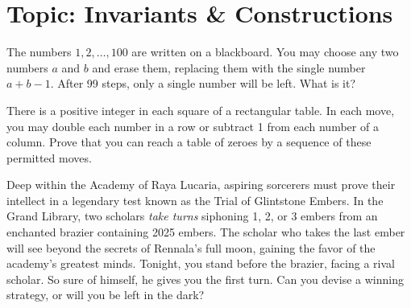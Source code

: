 

\DeclareRobustCommand{\stirling}{\genfrac\{\}{0pt}{}}
\setcounter{secnumdepth}{0} 

\newcommand{\weekNum}{8} %
\newcommand{\meetingDate}{Mar 12, 2025} 


\pagestyle{empty}
\sloppy
\maketitle

\section{Topic: Invariants \& Constructions}

\begin{problem}
    The numbers $1, 2, \ldots , 100$ are written on a blackboard. You may choose any two numbers $a$ and $b$ and erase them, replacing them with the single number $a + b - 1$. After 99 steps, only a single number will be left. What is it?
\end{problem}

\begin{problem}[C][3][Engel]
    There is a positive integer in each square of a rectangular table. In each move, you may double each number in a row or subtract 1 from each number of a column. Prove that you can reach a table of zeroes by a sequence of these permitted moves.
\end{problem}

\begin{problem}
    Deep within the Academy of Raya Lucaria, aspiring sorcerers must prove their intellect in a legendary test known as the Trial of Glintstone Embers. In the Grand Library, two scholars \emph{take turns} siphoning 1, 2, or 3 embers from an enchanted brazier containing 2025 embers. The scholar who takes the last ember will see beyond the secrets of Rennala’s full moon, gaining the favor of the academy’s greatest minds. Tonight, you stand before the brazier, facing a rival scholar. So sure of himself, he gives you the first turn. Can you devise a winning strategy, or will you be left in the dark?
\end{problem}

